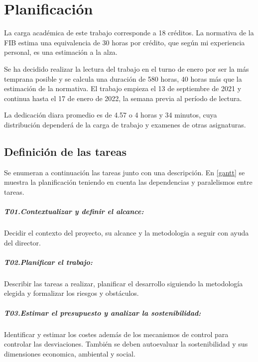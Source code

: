 
\chapter{Planificación}\label{desctasks}
La carga académica de este trabajo corresponde a 18 créditos. La normativa
de la FIB estima una equivalencia de 30 horas por crédito, que según mi experiencia
personal, es una estimación a la alza.

Se ha decidido realizar la lectura del trabajo en el turno de enero por ser la más
temprana posible y se calcula una duración de 580 horas, 40 horas más que la
estimación de la normativa. El trabajo empieza el 13 de septiembre
de 2021 y continua hasta el 17 de enero de 2022, la semana previa al período de lectura.

La dedicación diara promedio es de 4.57 o 4 horas y 34 minutos, cuya distribución dependerá
de la carga de trabajo y examenes de otras asignaturas.

\section{Definición de las tareas}
Se enumeran a continuación las tareas junto con una descripción. En \ref{gantt} se muestra la planificación teniendo
en cuenta las dependencias y paralelismos entre tareas.
\paragraph{T01.\quad Contextualizar y definir el alcance:}\label{T01}
Decidir el contexto del proyecto, su alcance y la metodologia a seguir con ayuda
del director.
\paragraph{T02.\quad Planificar el trabajo:}\label{T02}
Describir las tareas a realizar, planificar el desarrollo siguiendo la
metodología elegida y formalizar los riesgos y obstáculos.
\paragraph{T03.\quad Estimar el presupuesto y analizar la sostenibilidad:}\label{T03}
Identificar y estimar los costes además de los mecanismos de control para controlar las
desviaciones. También se deben autoevaluar la sostenibilidad y sus dimensiones economica,
ambiental y social.
